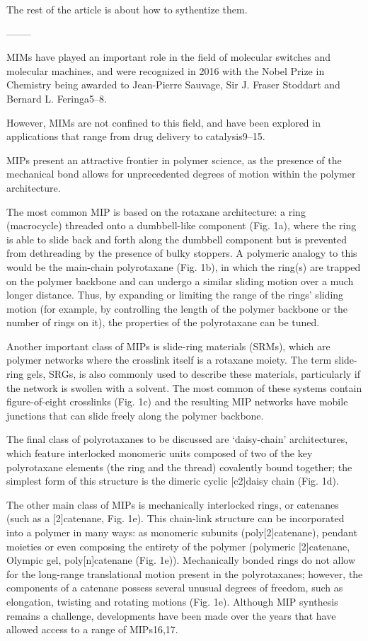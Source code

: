 \documentclass[../../main-notes.tex]{subfiles}
\begin{document}
The rest of the article is about how to sythentize them.

--------

\citep{hartMaterialPropertiesApplications2021}
MIMs have played an important role in the field of molecular switches and molecular machines, and were recognized in 2016 with the Nobel Prize in Chemistry being awarded to Jean-Pierre Sauvage, Sir J. Fraser Stoddart and Bernard L. Feringa5–8. 

However, MIMs are not confined to this field, and have been explored in applications that range from drug delivery to catalysis9–15.

MIPs present an attractive frontier in polymer science, as the presence of the mechanical bond allows for unprecedented degrees of motion within the polymer architecture. 



The most common MIP is based on the rotaxane architecture: a ring (macrocycle) threaded onto a dumbbell-like component (Fig. 1a), where the ring is able to slide back and forth along the dumbbell component but is prevented from dethreading by the presence of bulky stoppers. 
A polymeric analogy to this would be the main-chain polyrotaxane (Fig. 1b), in which the ring(s) are trapped on the polymer backbone and can undergo a similar sliding motion over a much longer distance. 
Thus, by expanding or limiting the range of the rings’ sliding motion (for example, by controlling the length of the polymer backbone or the number of rings on it), the properties of the polyrotaxane can be tuned. 

Another important class of MIPs is slide-ring materials (SRMs), which are polymer networks where the crosslink itself is a rotaxane moiety. 
The term slide-ring gels, SRGs, is also commonly used to describe these materials, particularly if the network is swollen with a solvent. 
The most common of these systems contain figure-of-eight crosslinks (Fig. 1c) and the resulting MIP networks have mobile junctions that can slide freely along the polymer backbone. 

The final class of polyrotaxanes to be discussed are ‘daisy-chain’ architectures, which feature interlocked monomeric units composed of two of the key polyrotaxane elements (the ring and the thread) covalently bound together; the simplest form of this structure is the dimeric cyclic [c2]daisy chain (Fig. 1d).

The other main class of MIPs is mechanically interlocked rings, or catenanes (such as a [2]catenane, Fig. 1e). 
This chain-link structure can be incorporated into a polymer in many ways: as monomeric subunits (poly[2]catenane), pendant moieties or even composing the entirety of the polymer (polymeric [2]catenane, Olympic gel, poly[n]catenane (Fig. 1e)). 
Mechanically bonded rings do not allow for the long-range translational motion present in the polyrotaxanes; however, the components of a catenane possess several unusual degrees of freedom, such as elongation, twisting and rotating motions (Fig. 1e). 
Although MIP synthesis remains a challenge, developments have been made over the years that have allowed access to a range of MIPs16,17. 
\end{document}
